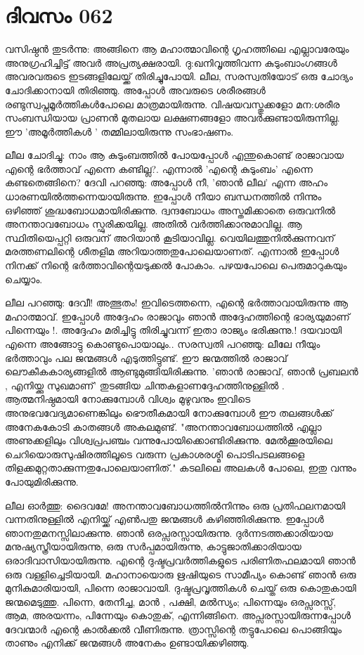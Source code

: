\newpage
\section{ദിവസം 062}


വസിഷ്ഠന്‍ തുടര്‍ന്നു: അങ്ങിനെ ആ മഹാത്മാവിന്റെ ഗൃഹത്തിലെ എല്ലാവരേയും അനുഗ്രഹിച്ചിട്ട്‌ അവര്‍ അപ്രത്യക്ഷരായി. ദു:ഖനിവൃത്തിവന്ന കുടുംബാംഗങ്ങള്‍ അവരവരുടെ ഇടങ്ങളിലേയ്ക്ക്‌ തിരിച്ചുപോയി. ലീല, സരസ്വതിയോട്‌ ഒരു ചോദ്യം ചോദിക്കാനായി തിരിഞ്ഞു. അപ്പോള്‍ അവരുടെ ശരീരങ്ങള്‍ രണ്ടുസ്വപ്നമൂര്‍ത്തികള്‍പോലെ മാത്രമായിരുന്നു. വിഷയവസ്തുക്കളോ മന:ശരീര സംബന്ധിയായ പ്രാണന്‍ മുതലായ ലക്ഷണങ്ങളോ അവര്‍ക്കുണ്ടായിരുന്നില്ല. ഈ 'അമൂര്‍ത്തികള്‍ ' തമ്മിലായിരുന്നു സംഭാഷണം. 

ലീല ചോദിച്ചു: നാം ആ കുടുംബത്തില്‍ പോയപ്പോള്‍ എന്തുകൊണ്ട്‌ രാജാവായ എന്റെ ഭര്‍ത്താവ്‌ എന്നെ കണ്ടില്ല?. എന്നാല്‍ 'എന്റെ കുടുംബം' എന്നെ കണ്ടതെങ്ങിനെ? ദേവി പറഞ്ഞു: അപ്പോള്‍ നീ, 'ഞാന്‍ ലീല' എന്ന അഹം ധാരണയില്‍ത്തന്നെയായിരുന്നു. ഇപ്പോള്‍ നീയാ ബന്ധനത്തില്‍ നിന്നും ഒഴിഞ്ഞ്‌ ശുദ്ധബോധമായിരിക്കുന്നു. ദ്വന്ദബോധം അസ്തമിക്കാതെ ഒരുവനില്‍ അനന്താവബോധം സ്ഫുരിക്കയില്ല. അതില്‍ വര്‍ത്തിക്കാനുമാവില്ല. ആ സ്ഥിതിയെപ്പറ്റി ഒരുവന്‌ അറിയാന്‍ കൂടിയാവില്ല. വെയിലത്തുനില്‍ക്കുന്നവന്‌ മരത്തണലിന്റെ ശീതളിമ അറിയാത്തതുപോലെയാണത്‌. എന്നാല്‍ ഇപ്പോള്‍ നിനക്ക്‌ നിന്റെ ഭര്‍ത്താവിന്റെയടുക്കല്‍ പോകാം. പഴയപോലെ പെരുമാറുകയും ചെയ്യാം.

ലീല പറഞ്ഞു: ദേവീ! അത്ഭുതം! ഇവിടെത്തന്നെ, എന്റെ ഭര്‍ത്താവായിരുന്നു ആ മഹാത്മാവ്‌. ഇപ്പോള്‍ അദ്ദേഹം രാജാവും ഞാന്‍ അദ്ദേഹത്തിന്റെ ഭാര്യയുമാണ്‌ പിന്നെയും !. അദ്ദേഹം മരിച്ചിട്ടു തിരിച്ചുവന്ന് ഇതാ രാജ്യം ഭരിക്കുന്നു.! ദയവായി എന്നെ അങ്ങോട്ടു കൊണ്ടുപൊയാലും.. സരസ്വതി പറഞ്ഞു: ലീലേ നീയും ഭര്‍ത്താവും പല ജന്മങ്ങള്‍ എടുത്തിട്ടുണ്ട്‌. ഈ ജന്മത്തില്‍ രാജാവ്‌ ലൌകീകകാര്യങ്ങളില്‍ ആണ്ടുമുങ്ങിയിരിക്കുന്നു. 'ഞാന്‍ രാജാവ്‌, ഞാന്‍ പ്രബലന്‍ , എനിയ്ക്കു സുഖമാണ്‌' തുടങ്ങിയ ചിന്തകളാണദ്ദേഹത്തിനുള്ളില്‍ . ആത്മനിഷ്ഠമായി നോക്കുമ്പോള്‍ വിശ്വം മുഴുവനും ഇവിടെ അനുഭവവേദ്യമാണെങ്കിലും ഭൌതീകമായി  നോക്കുമ്പോള്‍ ഈ തലങ്ങള്‍ക്ക്‌ അനേകകോടി കാതങ്ങള്‍ അകലമുണ്ട്‌. "അനന്താവബോധത്തില്‍ എല്ലാ അണുക്കളിലും വിശ്വപ്രപഞ്ചം വന്നുപോയിക്കൊണ്ടിരിക്കുന്നു. മേല്‍ക്കൂരയിലെ ചെറിയൊരുസുഷിരത്തിലൂടെ വരുന്ന പ്രകാശരശ്മി പൊടിപടലങ്ങളെ തിളക്കമുറ്റതാക്കുന്നതുപോലെയാണിത്‌." കടലിലെ അലകള്‍ പോലെ, ഇതു വന്നും പോയുമിരിക്കുന്നു.

ലീല ഓര്‍ത്തു: ദൈവമേ! അനന്താവബോധത്തില്‍നിന്നും ഒരു പ്രതിഫലനമായി വന്നതിനുള്ളില്‍ എനിയ്ക്ക്‌ എണ്‍പതു ജന്മങ്ങള്‍ കഴിഞ്ഞിരിക്കുന്നു. ഇപ്പോൾ ഞാനതുമനസ്സിലാക്കുന്നു. ഞാന്‍ ഒരപ്സരസ്സായിരുന്നു. ദുര്‍ന്നടത്തക്കാരിയായ മനുഷ്യസ്ത്രീയായിരുന്നു, ഒരു സര്‍പ്പമായിരുന്നു, കാട്ടുജാതിക്കാരിയായ ഒരാദിവാസിയായിരുന്നു. എന്റെ ദുഷ്ടപ്രവര്‍ത്തികളുടെ പരിണിതഫലമായി ഞാന്‍ ഒരു വള്ളിച്ചെടിയായി. മഹാനായൊരു ഋഷിയുടെ സാമീപ്യം കൊണ്ട്‌ ഞാന്‍ ഒരു മുനികുമാരിയായി, പിന്നെ രാജാവായി. ദുഷ്ടപ്രവൃത്തികള്‍ ചെയ്ത്‌ ഒരു കൊതുകായി ജന്മമെടുത്തു. പിന്നെ, തേനീച്ച, മാന്‍ , പക്ഷി, മല്‍സ്യം; പിന്നെയും ഒരപ്സരസ്സ്‌, ആമ, അരയന്നം, പിന്നേയും കൊതുക്‌, എന്നിങ്ങിനെ. അപ്സരസ്സായിരുന്നപ്പോള്‍ ദേവന്മാര്‍ എന്റെ കാല്‍ക്കല്‍ വീണിരുന്നു. ത്രാസ്സിന്റെ തട്ടുപോലെ പൊങ്ങിയും താണും എനിക്ക് ജന്മങ്ങള്‍ അനേകം ഉണ്ടായിക്കഴിഞ്ഞു.

